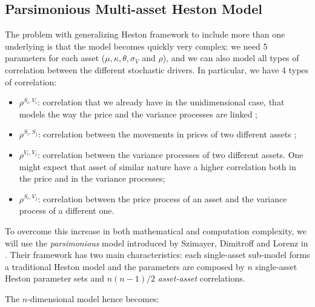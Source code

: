 \subsection{Parsimonious Multi-asset Heston Model}
The problem with generalizing Heston framework to include more than one underlying is that the model becomes quickly very complex: we need 5 parameters for each asset ($\mu, \kappa,\theta, \sigma_V$ and $ \rho$), and we can also model all types of correlation between the different stochastic drivers. In particular, we have 4 types of correlation: 
\begin{itemize}
	\item $ \rho^{S_i , V_i}$:  correlation that we already have in the unidimensional case, that models the way the price and the variance processes are linked ;
	\item $ \rho^{S_i , S_j}$: correlation between the movements in prices of two different assets ;
	\item $\rho^{V_i , V_j} $: correlation between the variance processes of two different assets. One might expect that asset of similar nature have a higher correlation both in the price and in the variance processes;
	\item $\rho^{S_i , V_j} $: correlation between the price process of an asset and the variance process of a different one.
\end{itemize}

To overcome this increase in both mathematical and computation complexity, we will use the \textit{parsimonious} model introduced by Szimayer, Dimitroff and Lorenz in \citep{PARSIMONIOUS2011}. Their framework has two main characteristics: each single-asset sub-model forms a traditional Heston model and the parameters are  composed by $n$ single-asset Heston parameter sets and $n (n-1)/2$  \textit{asset-asset} correlations.

The $n$-dimensional model  hence becomes:


